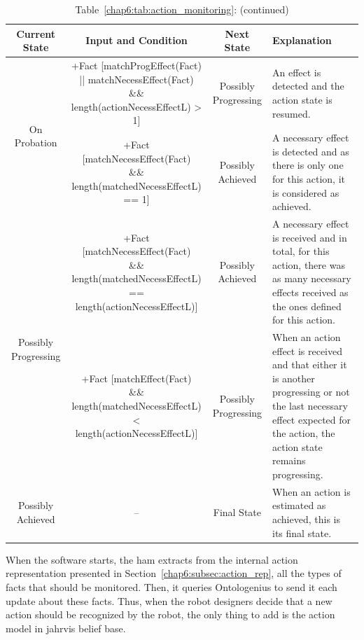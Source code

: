 \documentclass[a4paper,11pt,twoside]{StyleThese}
\begin{document}
\begin{landscape}
\begin{table}[htb!]
  	\caption*{Table~\ref{chap6:tab:action_monitoring}: (continued)}
	\begin{tabularx}{\linewidth}{| c | c | c | X |}
		Current State & Input and Condition & Next State & Explanation\\ 
		\hline \hline
		\multirow{2}{*}{On Probation} 
		& \makecell{+Fact [matchProgEffect(Fact)
			\\ || matchNecessEffect(Fact)
			\\ \&\& length(actionNecessEffectL) > 1]} & Possibly Progressing & An effect is detected and the action state is resumed.\\
		\cline{2-4}
		& \makecell{+Fact [matchNecessEffect(Fact) 
			\\ \&\& length(matchedNecessEffectL) == 1]} & Possibly Achieved 
		& A necessary effect is detected and as there is only one for this action, it is considered as achieved.\\
		\hline
		\multirow{2}{*}{Possibly Progressing} 
		& \makecell{+Fact [matchNecessEffect(Fact) 
			\\ \&\& length(matchedNecessEffectL)
			\\ == length(actionNecessEffectL)]} & Possibly Achieved 
		& A necessary effect is received and in total, for this action, there was as many necessary effects received as the ones defined for this action.\\
		\cline{2-4}
		& \makecell{+Fact [matchEffect(Fact) 
			\\ \&\& length(matchedNecessEffectL)
			\\ < length(actionNecessEffectL)]} & Possibly Progressing 
		& When an action effect is received and that either it is another progressing or not the last necessary effect expected for the action, the action state remains progressing.\\  
		\hline
		Possibly Achieved & -- & Final State & When an action is estimated as achieved, this is its final state.\\
		\hline
	\end{tabularx}
	
\end{table}
\vspace*{\fill}
\end{landscape}

\restoregeometry

When the software starts, the \acrshort{ham} extracts from the internal action representation presented in Section~\ref{chap6:subsec:action_rep}, all the types of facts that should be monitored. Then, it queries Ontologenius to send it each update about these facts. Thus, when the robot designers decide that a new action should be recognized by the robot, the only thing to add is the action model in \acrshort{jahrvis} belief base.
\end{document}
